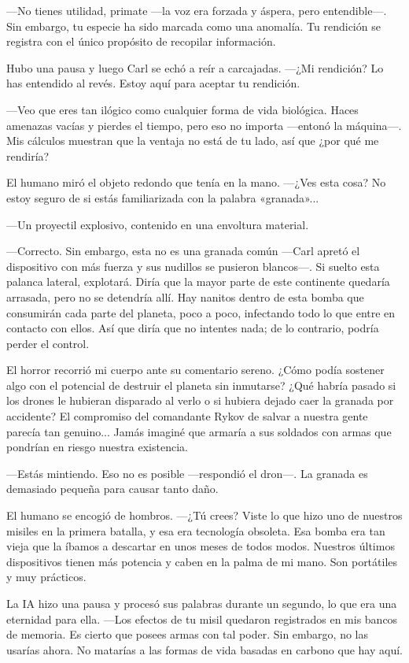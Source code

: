 —No tienes utilidad, primate —la voz era forzada y áspera, pero entendible—. Sin embargo, tu especie ha sido marcada como una anomalía. Tu rendición se registra con el único propósito de recopilar información.

Hubo una pausa y luego Carl se echó a reír a carcajadas. —¿Mi rendición? Lo has entendido al revés. Estoy aquí para aceptar tu rendición.

—Veo que eres tan ilógico como cualquier forma de vida biológica. Haces amenazas vacías y pierdes el tiempo, pero eso no importa —entonó la máquina—. Mis cálculos muestran que la ventaja no está de tu lado, así que ¿por qué me rendiría?

El humano miró el objeto redondo que tenía en la mano. —¿Ves esta cosa? No estoy seguro de si estás familiarizada con la palabra «granada»...

—Un proyectil explosivo, contenido en una envoltura material.

—Correcto. Sin embargo, esta no es una granada común —Carl apretó el dispositivo con más fuerza y sus nudillos se pusieron blancos—. Si suelto esta palanca lateral, explotará. Diría que la mayor parte de este continente quedaría arrasada, pero no se detendría allí. Hay nanitos dentro de esta bomba que consumirán cada parte del planeta, poco a poco, infectando todo lo que entre en contacto con ellos. Así que diría que no intentes nada; de lo contrario, podría perder el control.

El horror recorrió mi cuerpo ante su comentario sereno. ¿Cómo podía sostener algo con el potencial de destruir el planeta sin inmutarse? ¿Qué habría pasado si los drones le hubieran disparado al verlo o si hubiera dejado caer la granada por accidente? El compromiso del comandante Rykov de salvar a nuestra gente parecía tan genuino... Jamás imaginé que armaría a sus soldados con armas que pondrían en riesgo nuestra existencia.

—Estás mintiendo. Eso no es posible —respondió el dron—. La granada es demasiado pequeña para causar tanto daño.

El humano se encogió de hombros. —¿Tú crees? Viste lo que hizo uno de nuestros misiles en la primera batalla, y esa era tecnología obsoleta. Esa bomba era tan vieja que la íbamos a descartar en unos meses de todos modos. Nuestros últimos dispositivos tienen más potencia y caben en la palma de mi mano. Son portátiles y muy prácticos.

La IA hizo una pausa y procesó sus palabras durante un segundo, lo que era una eternidad para ella. —Los efectos de tu misil quedaron registrados en mis bancos de memoria. Es cierto que posees armas con tal poder. Sin embargo, no las usarías ahora. No matarías a las formas de vida basadas en carbono que hay aquí.

